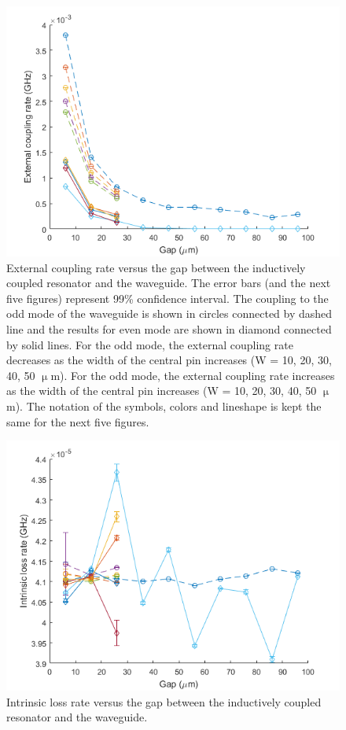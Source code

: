 \documentclass[noshowpacs,amsmath,
superscriptaddress,
10pt]{article}
\begin{document}
\begin{figure}[!ht]
\centering
\includegraphics[width=12cm] {tInduc_ke}
\caption{External coupling rate versus the gap between the inductively coupled resonator and the waveguide. The error bars (and the next five figures) represent 99\% confidence interval. The coupling to the odd mode of the waveguide is shown in circles connected by dashed line and the results for even mode are shown in diamond connected by solid lines. For the odd mode, the external coupling rate decreases as the width of the central pin increases (W = 10, 20, 30, 40, 50 $\upmu$m). For the odd mode, the external coupling rate increases as the width of the central pin increases (W = 10, 20, 30, 40, 50 $\upmu$m). The notation of the symbols, colors and lineshape is kept the same for the next five figures.}
\label{pic:tInduc_ke}
\end{figure}

\begin{figure}[!ht]
\centering
\includegraphics[width=12cm] {tInduc_ki}
\caption{Intrinsic loss rate versus the gap between the inductively coupled resonator and the waveguide. }
\label{pic:tInduc_ki}
\end{figure}
\end{document}
